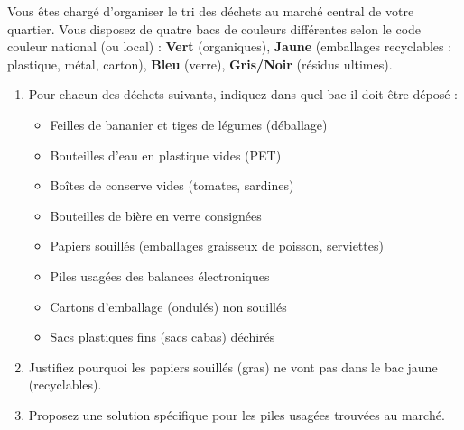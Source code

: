 \documentclass[11pt]{article}
\begin{document}
\begin{exercice}
Vous êtes chargé d'organiser le tri des déchets au marché central de votre quartier. Vous disposez de quatre bacs de couleurs différentes selon le code couleur national (ou local) : \textbf{Vert} (organiques), \textbf{Jaune} (emballages recyclables : plastique, métal, carton), \textbf{Bleu} (verre), \textbf{Gris/Noir} (résidus ultimes).

\begin{enumerate}
    \item Pour chacun des déchets suivants, indiquez dans quel bac il doit être déposé :
    \begin{itemize}
        \item Feilles de bananier et tiges de légumes (déballage) \\
        \item Bouteilles d'eau en plastique vides (PET) \\
        \item Boîtes de conserve vides (tomates, sardines) \\
        \item Bouteilles de bière en verre consignées \\
        \item Papiers souillés (emballages graisseux de poisson, serviettes) \\
        \item Piles usagées des balances électroniques \\
        \item Cartons d'emballage (ondulés) non souillés \\
        \item Sacs plastiques fins (sacs cabas) déchirés
    \end{itemize}
    \item Justifiez pourquoi les papiers souillés (gras) ne vont pas dans le bac jaune (recyclables).
    \item Proposez une solution spécifique pour les piles usagées trouvées au marché.
\end{enumerate}
\end{exercice}
\end{document}
